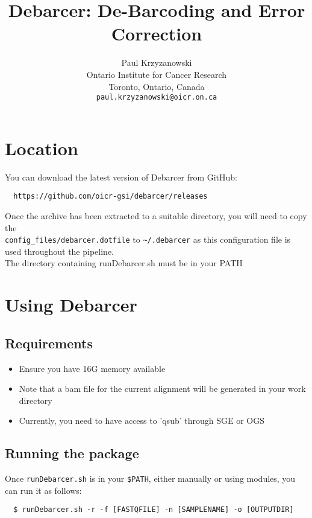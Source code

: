 \documentclass{article}
\title{Debarcer: De-Barcoding and Error Correction}
\author{Paul Krzyzanowski\\
  Ontario Institute for Cancer Research\\
  Toronto, Ontario, Canada\\
  \texttt{paul.krzyzanowski@oicr.on.ca}}
\begin{document}
\maketitle


\section{Location}

	You can download the latest version of Debarcer from GitHub:

\begin{verbatim}
  https://github.com/oicr-gsi/debarcer/releases
\end{verbatim}

Once the archive has been extracted to a suitable directory, you
will need to copy the \\
\texttt{config\_files/debarcer.dotfile} 
to \texttt{\~\//.debarcer} as 
this configuration file is used throughout the pipeline. \\

The directory containing runDebarcer.sh must be in your PATH

\section{Using Debarcer}

\subsection{Requirements}

\begin{itemize}
  \item Ensure you have 16G memory available
  \item Note that a bam file for the current alignment will be generated in your work directory
  \item Currently, you need to have access to 'qsub' through SGE or OGS
\end{itemize}

\subsection{Running the package}

Once \texttt{runDebarcer.sh} is in your \texttt{\$PATH}, either manually or using modules, you can run it as follows:

\begin{verbatim}
  $ runDebarcer.sh -r -f [FASTQFILE] -n [SAMPLENAME] -o [OUTPUTDIR]
\end{verbatim}
\end{document}
